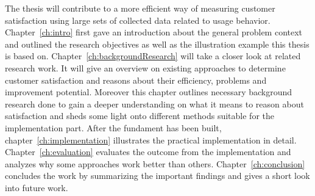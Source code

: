 The thesis will contribute to a more efficient way of measuring customer satisfaction using large sets of collected data related to usage behavior. Chapter~\ref{ch:intro} first gave an introduction about the general problem context and outlined the research objectives as well as the illustration example this thesis is based on. Chapter~\ref{ch:backgroundResearch} will take a closer look at related research work. It will give an overview on existing approaches to determine customer satisfaction and reasons about their efficiency, problems and improvement potential. Moreover this chapter outlines necessary background research done to gain a deeper understanding on what it means to reason about satisfaction and sheds some light onto different methods suitable for the implementation part. After the fundament has been built, chapter~\ref{ch:implementation} illustrates the practical implementation in detail. Chapter~\ref{ch:evaluation} evaluates the outcome from the implementation and analyzes why some approaches work better than others. Chapter~\ref{ch:conclusion} concludes the work by summarizing the important findings and gives a short look into future work.
